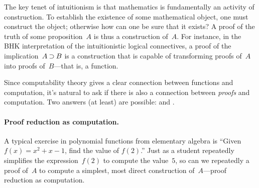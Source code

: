 The key tenet of intuitionism
is that mathematics is fundamentally an activity of construction.
To establish the existence of some mathematical object, one must construct the object; otherwise how can one be sure that it exists?
A proof of the truth of some proposition~$A$ is thus a construction of~$A$.
%
%
For instance, in the \acf{BHK} interpretation of the intuitionistic logical connectives, a proof of the implication~$A \mathbin{\supset} B$ is a construction that is capable of transforming proofs of~$A$ into proofs of~$B$---that is, a function.

Since computability theory gives a clear connection between functions and computation,
it's natural to ask if there is also a connection between \emph{proofs} and computation.
Two answers (at least) are possible:  and .


\paragraph*{Proof reduction as computation.}
A typical exercise in polynomial functions from elementary algebra is ``Given $f(x) = x^2 + x - 1$, find the value of $f(2)$.''
Just as a student repeatedly simplifies the expression~$f(2)$ to compute the value~$5$, so can we repeatedly  a proof of~$A$ to compute a simplest, most direct construction of~$A$---proof reduction as computation.  

